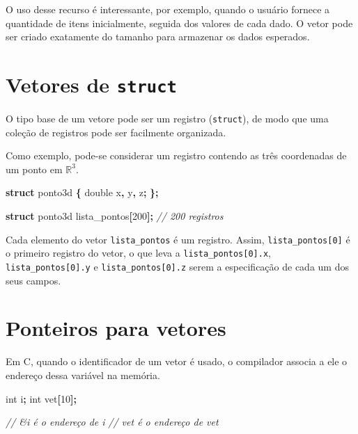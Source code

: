 \documentclass[
  11pt,
  a4paper,
]{scrbook}
\newenvironment{Shaded}{\begin{snugshade}}{\end{snugshade}}
\newcommand{\CommentTok}[1]{\textcolor[rgb]{0.56,0.35,0.01}{\textit{#1}}}
\newcommand{\DataTypeTok}[1]{\textcolor[rgb]{0.13,0.29,0.53}{#1}}
\newcommand{\DecValTok}[1]{\textcolor[rgb]{0.00,0.00,0.81}{#1}}
\newcommand{\KeywordTok}[1]{\textcolor[rgb]{0.13,0.29,0.53}{\textbf{#1}}}
\newcommand{\NormalTok}[1]{#1}
\newcommand{\OperatorTok}[1]{\textcolor[rgb]{0.81,0.36,0.00}{\textbf{#1}}}
\begin{document}
O uso desse recurso é interessante, por exemplo, quando o usuário
fornece a quantidade de itens inicialmente, seguida dos valores de cada
dado. O vetor pode ser criado exatamente do tamanho para armazenar os
dados esperados.

\section{\texorpdfstring{Vetores de
\texttt{struct}}{Vetores de struct}}\label{vetores-de-struct}

O tipo base de um vetore pode ser um registro (\texttt{struct}), de modo
que uma coleção de registros pode ser facilmente organizada.

Como exemplo, pode-se considerar um registro contendo as três
coordenadas de um ponto em \(\mathbb{R}^3\).

\begin{Shaded}
\begin{Highlighting}[]
\KeywordTok{struct}\NormalTok{ ponto3d }\OperatorTok{\{}
    \DataTypeTok{double}\NormalTok{ x}\OperatorTok{,}\NormalTok{ y}\OperatorTok{,}\NormalTok{ z}\OperatorTok{;}
\OperatorTok{\};}

\KeywordTok{struct}\NormalTok{ ponto3d lista\_pontos}\OperatorTok{[}\DecValTok{200}\OperatorTok{];}  \CommentTok{// 200 registros}
\end{Highlighting}
\end{Shaded}

Cada elemento do vetor \texttt{lista\_pontos} é um registro. Assim,
\texttt{lista\_pontos{[}0{]}} é o primeiro registro do vetor, o que leva
a \texttt{lista\_pontos{[}0{]}.x}, \texttt{lista\_pontos{[}0{]}.y} e
\texttt{lista\_pontos{[}0{]}.z} serem a especificação de cada um dos
seus campos.

\section{Ponteiros para vetores}\label{ponteiros-para-vetores}

Em C, quando o identificador de um vetor é usado, o compilador associa a
ele o endereço dessa variável na memória.

\begin{Shaded}
\begin{Highlighting}[]
\DataTypeTok{int}\NormalTok{ i}\OperatorTok{;} 
\DataTypeTok{int}\NormalTok{ vet}\OperatorTok{[}\DecValTok{10}\OperatorTok{];}

\CommentTok{// \&i é o endereço de i}
\CommentTok{// vet é o endereço de vet}
\end{Highlighting}
\end{Shaded}



\backmatter
\printbibliography


\printindex
\end{document}
